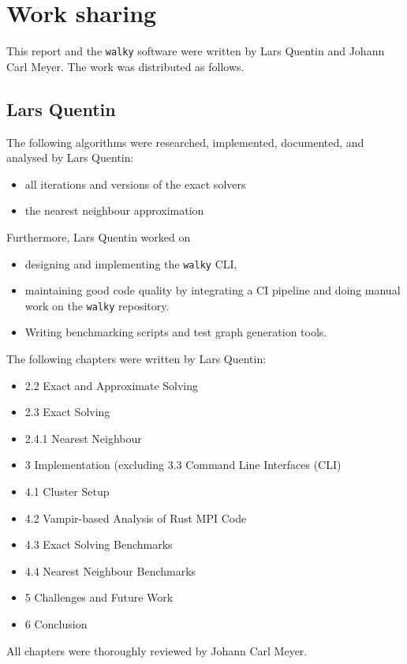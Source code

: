 \section{Work sharing}

This report and the \texttt{walky} software were written by
Lars Quentin and Johann Carl Meyer. The work was distributed as follows.

\subsection{Lars Quentin}
The following algorithms were researched, implemented, documented,
and analysed by Lars Quentin:
\begin{itemize}
  \item all iterations and versions of the exact solvers
  \item the nearest neighbour approximation
\end{itemize}
Furthermore, Lars Quentin worked on
\begin{itemize}
  \item designing and implementing the \texttt{walky} \ac{CLI},
  \item maintaining good code quality by integrating a \ac{CI} pipeline
    and doing manual work on the \texttt{walky} repository.
  \item Writing benchmarking scripts and test graph generation tools.
\end{itemize}

The following chapters were written by Lars Quentin:
\begin{itemize}
\item 2.2 Exact and Approximate Solving
\item 2.3 Exact Solving
\item 2.4.1 Nearest Neighbour
\item 3 Implementation (excluding 3.3 Command Line Interfaces (CLI)
\item 4.1 Cluster Setup
\item 4.2 Vampir-based Analysis of Rust MPI Code
\item 4.3 Exact Solving Benchmarks
\item 4.4 Nearest Neighbour Benchmarks
\item 5 Challenges and Future Work
\item 6 Conclusion
\end{itemize}

All chapters were thoroughly reviewed by Johann Carl Meyer.

